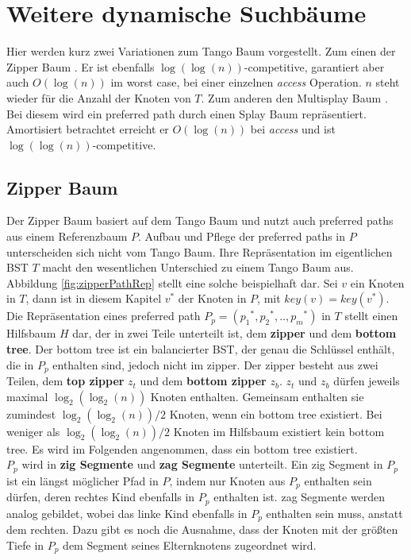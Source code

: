 \documentclass[a4paper,12pt]{article}
\begin{document}
\section {Weitere dynamische Suchbäume}
Hier werden kurz zwei Variationen zum Tango Baum vorgestellt. Zum einen der Zipper Baum \cite{zipper}. Er ist ebenfalls $\log\left(\log\left(n\right)\right)$-competitive,  garantiert aber auch  $O\left(\log \left(n\right)\right)$ im worst case, bei einer einzelnen \textit{access} Operation. $n$ steht wieder für die Anzahl der Knoten von $T$. Zum anderen den Multisplay Baum \cite{multisplay}. Bei diesem wird ein preferred path durch einen Splay Baum repräsentiert. Amortisiert betrachtet erreicht er $O\left(\log \left(n\right)\right)$ bei \textit{access} und ist  $\log\left(\log\left(n\right)\right)$-competitive. 

\subsection{Zipper Baum}
Der Zipper Baum basiert auf dem Tango Baum und nutzt auch preferred paths aus einem Referenzbaum $P$. Aufbau und Pflege der preferred paths in $P$ unterscheiden sich nicht vom Tango Baum.  Ihre Repräsentation im eigentlichen BST $T$ macht den wesentlichen Unterschied zu einem Tango Baum aus. Abbildung \ref{fig:zipperPathRep} stellt eine solche beispielhaft dar.  Sei $v$ ein Knoten in $T$, dann ist in diesem Kapitel $v^*$ der Knoten in $P$, mit $\mathit{key}\left(v\right) =\mathit{key}\left(v^*\right)$. Die Repräsentation eines preferred path  $P_p = \left({p_1}^*,{p_2}^*,..,{p_m}^*\right)$ in $T$ stellt einen Hilfsbaum $H$ dar, der in zwei Teile unterteilt ist, dem \textbf{zipper} und dem \textbf{bottom tree}.  Der bottom tree ist ein balancierter BST, der genau die Schlüssel enthält, die in $P_p$ enthalten sind, jedoch nicht im zipper. Der zipper besteht aus zwei Teilen, dem \textbf{top zipper} $z_t$ und dem \textbf{bottom zipper} $z_b$. $z_t$ und $z_b$ dürfen jeweils maximal $\log_2\left(\log_2\left(n\right)\right)$ Knoten enthalten. Gemeinsam  enthalten sie zumindest $\log_2\left(\log_2\left(n\right)\right) / 2$ Knoten, wenn ein bottom tree existiert. Bei weniger als $\log_2\left(\log_2\left(n\right)\right) / 2$ Knoten im Hilfsbaum existiert kein bottom tree. Es wird im Folgenden angenommen, dass ein bottom tree existiert. \\
$P_p$ wird in \textbf{zig Segmente} und \textbf{zag Segmente} unterteilt. Ein zig Segment in $P_p$ ist ein längst möglicher Pfad in $P$, indem nur Knoten aus $P_p$ enthalten sein dürfen, deren rechtes Kind ebenfalls in $P_p$ enthalten ist. zag Segmente werden analog gebildet, wobei das linke Kind ebenfalls in $P_p$ enthalten sein muss, anstatt dem rechten. Dazu gibt es noch die Ausnahme, dass der Knoten mit der größten Tiefe in $P_p$ dem Segment seines Elternknotens zugeordnet wird.\\
\end{document}
